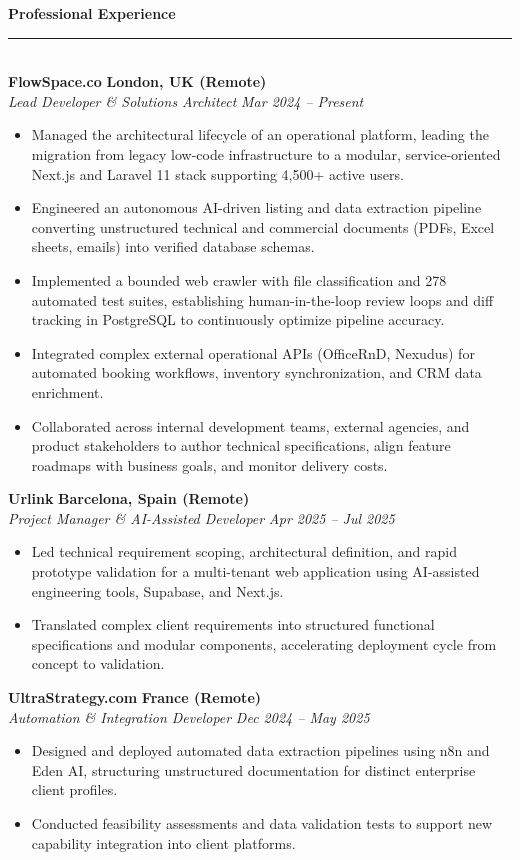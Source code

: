 \documentclass[10pt,a4paper]{article}
\newcommand{\cvsection}[1]{%
  \vspace{6pt}%
  {\large\bfseries\color{primary}#1}\\[-3pt]%
  {\color{linegray}\rule{\textwidth}{0.75pt}}\\[3pt]%
}
\newcommand{\cventry}[4]{%
  \textbf{#1} \hfill \textbf{\color{secondary}#2}\\
  \textit{\color{secondary}#3} \hfill \textit{\color{secondary}#4}\\[2pt]
}
\begin{document}
\cvsection{Professional Experience}

\cventry{FlowSpace.co}{London, UK (Remote)}{Lead Developer \& Solutions Architect}{Mar 2024 -- Present}
\begin{itemize}
  \item Managed the architectural lifecycle of an operational platform, leading the migration from legacy low-code infrastructure to a modular, service-oriented Next.js and Laravel 11 stack supporting 4,500+ active users.
  \item Engineered an autonomous AI-driven listing and data extraction pipeline converting unstructured technical and commercial documents (PDFs, Excel sheets, emails) into verified database schemas.
  \item Implemented a bounded web crawler with file classification and 278 automated test suites, establishing human-in-the-loop review loops and diff tracking in PostgreSQL to continuously optimize pipeline accuracy.
  \item Integrated complex external operational APIs (OfficeRnD, Nexudus) for automated booking workflows, inventory synchronization, and CRM data enrichment.
  \item Collaborated across internal development teams, external agencies, and product stakeholders to author technical specifications, align feature roadmaps with business goals, and monitor delivery costs.
\end{itemize}

\vspace{2pt}
\cventry{Urlink}{Barcelona, Spain (Remote)}{Project Manager \& AI-Assisted Developer}{Apr 2025 -- Jul 2025}
\begin{itemize}
  \item Led technical requirement scoping, architectural definition, and rapid prototype validation for a multi-tenant web application using AI-assisted engineering tools, Supabase, and Next.js.
  \item Translated complex client requirements into structured functional specifications and modular components, accelerating deployment cycle from concept to validation.
\end{itemize}

\vspace{2pt}
\cventry{UltraStrategy.com}{France (Remote)}{Automation \& Integration Developer}{Dec 2024 -- May 2025}
\begin{itemize}
  \item Designed and deployed automated data extraction pipelines using n8n and Eden AI, structuring unstructured documentation for distinct enterprise client profiles.
  \item Conducted feasibility assessments and data validation tests to support new capability integration into client platforms.
\end{itemize}
\end{document}

